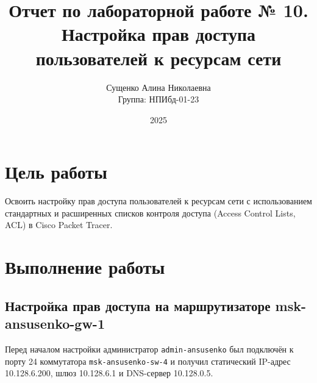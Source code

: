 

\title{Отчет по лабораторной работе № 10. \\Настройка прав доступа пользователей к ресурсам сети}
\author{Сущенко Алина Николаевна \\ Группа: НПИбд-01-23}
\date{2025}



\maketitle
\newpage

\tableofcontents

\newpage
\section{Цель работы}
Освоить настройку прав доступа пользователей к ресурсам сети с использованием стандартных и расширенных списков контроля доступа (Access Control Lists, ACL) в Cisco Packet Tracer.

\newpage
\section{Выполнение работы}

\subsection{Настройка прав доступа на маршрутизаторе msk-ansusenko-gw-1}
Перед началом настройки администратор \texttt{admin-ansusenko} был подключён к порту 24 коммутатора \texttt{msk-ansusenko-sw-4} и получил статический IP-адрес 10.128.6.200, шлюз 10.128.6.1 и DNS-сервер 10.128.0.5.

